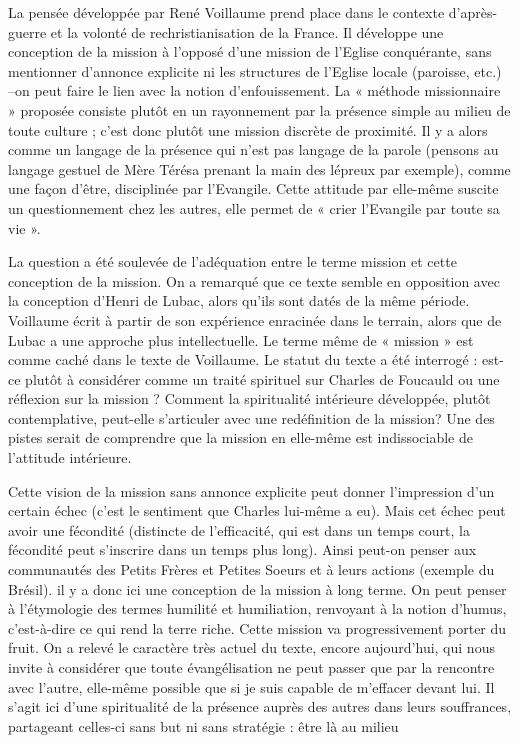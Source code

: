 La pensée développée par René Voillaume prend place dans le contexte d’après-guerre et la volonté de rechristianisation de la France. Il développe une conception de la mission à l’opposé d’une mission de l’Eglise conquérante, sans mentionner d’annonce explicite ni les structures de l’Eglise locale (paroisse, etc.) –on peut faire le lien avec la notion d’enfouissement. La « méthode missionnaire » proposée consiste plutôt en un rayonnement par la présence simple au milieu de toute culture ; c’est donc plutôt une mission discrète de proximité. Il y a alors comme un langage de la présence qui n’est pas langage de la parole (pensons au langage gestuel de Mère Térésa prenant la main des lépreux par exemple), comme une façon d’être, disciplinée par l’Evangile. Cette attitude par elle-même suscite un questionnement chez les autres, elle permet de « crier l’Evangile par toute sa vie ».

La question a été soulevée de l’adéquation entre le terme mission et cette conception de la mission. On a remarqué que ce texte semble en opposition avec la conception d’Henri de Lubac, alors qu’ils sont datés de la même période. Voillaume écrit à partir de son expérience enracinée dans le terrain, alors que de Lubac a une approche plus intellectuelle. Le terme même de « mission » est comme caché dans le texte de Voillaume. Le statut du texte a été interrogé : est-ce plutôt à considérer comme un traité spirituel sur Charles de Foucauld ou une réflexion sur la mission ? Comment la spiritualité intérieure développée, plutôt contemplative, peut-elle s’articuler avec une redéfinition de la mission? Une des pistes serait de comprendre que la mission en elle-même est indissociable de l’attitude intérieure.

Cette vision de la mission sans annonce explicite peut donner l’impression d’un certain échec (c’est le sentiment que Charles lui-même a eu). Mais cet échec peut avoir une fécondité (distincte de l’efficacité, qui est dans un temps court, la fécondité peut s’inscrire dans un temps plus long). Ainsi peut-on penser aux communautés des Petits Frères et Petites Soeurs et à leurs actions (exemple du Brésil). il y a donc ici une conception de la mission à long terme. On peut penser à l’étymologie des termes humilité et humiliation, renvoyant à la notion d’humus, c’est-à-dire ce qui rend la terre riche. Cette mission va progressivement porter du fruit.
On a relevé le caractère très actuel du texte, encore aujourd’hui, qui nous invite à considérer que toute évangélisation ne peut passer que par la rencontre avec l’autre, elle-même possible que si je suis capable de m’effacer devant lui. Il s’agit ici d’une spiritualité de la présence auprès des autres dans leurs souffrances, partageant celles-ci sans but ni sans stratégie : être là au milieu
 
